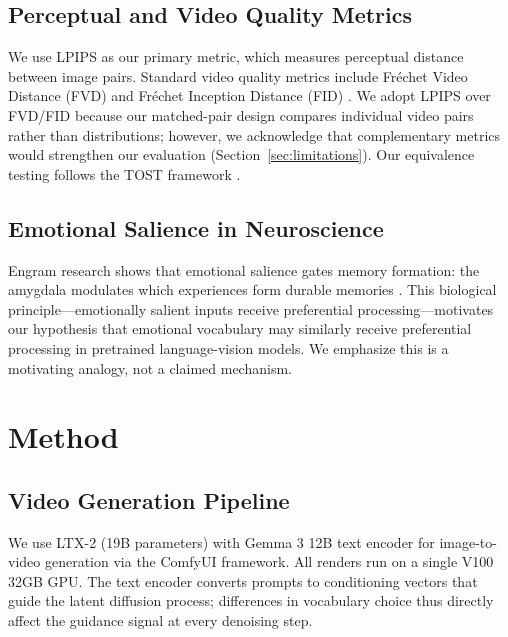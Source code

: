 \documentclass[10pt,twocolumn,letterpaper]{article}
\begin{document}
\subsection{Perceptual and Video Quality Metrics}
We use LPIPS \cite{zhang2018} as our primary metric, which measures perceptual distance between image pairs. Standard video quality metrics include Fr\'{e}chet Video Distance (FVD) \cite{unterthiner2018fvd} and Fr\'{e}chet Inception Distance (FID) \cite{heusel2017fid}. We adopt LPIPS over FVD/FID because our matched-pair design compares individual video pairs rather than distributions; however, we acknowledge that complementary metrics would strengthen our evaluation (Section~\ref{sec:limitations}). Our equivalence testing follows the TOST framework \cite{lakens2017equivalence}.

\subsection{Emotional Salience in Neuroscience}
Engram research shows that emotional salience gates memory formation: the amygdala modulates which experiences form durable memories \cite{josselyn2015,josselyn2020}. This biological principle---emotionally salient inputs receive preferential processing---motivates our hypothesis that emotional vocabulary may similarly receive preferential processing in pretrained language-vision models. We emphasize this is a motivating analogy, not a claimed mechanism.

\section{Method}

\subsection{Video Generation Pipeline}

We use LTX-2 \cite{hacohen2024ltx} (19B parameters) with Gemma 3 12B text encoder \cite{team2024gemma} for image-to-video generation via the ComfyUI framework. All renders run on a single V100 32GB GPU. The text encoder converts prompts to conditioning vectors that guide the latent diffusion process; differences in vocabulary choice thus directly affect the guidance signal at every denoising step.
\end{document}
